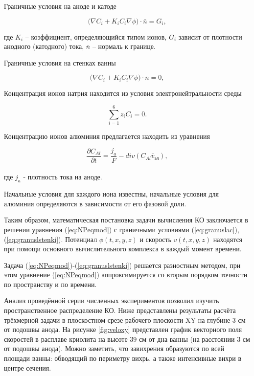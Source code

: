 \documentclass[pdflatex,sn-mathphys-gost]{pmi-jnl}
\begin{document}
Граничные условия на аноде и катоде

\begin{equation}\label{eq:granuslac}
	\big(\nabla C_i + K_i C_i \nabla \phi \big) \cdot \bar{n} = G_i,
\end{equation}

где $K_i$ – коэффициент, определяющийся типом ионов,  $G_i$ зависит от плотности анодного (катодного) тока, $\bar{n}$ – нормаль к границе.

Граничные условия на стенках ванны

\begin{equation}\label{eq:granuslstenki}
	\big(\nabla C_i + K_i C_i \nabla \phi \big) \cdot \bar{n} = 0,
\end{equation}

Концентрация ионов натрия находится из условия электронейтральности среды

\[ \sum\limits_{i=1}^6 z_iC_i = 0. \]

Концентрацию ионов алюминия предлагается находить из уравнения

\[ \frac{\partial C_{Al}}{\partial t} = \frac{j_a}{F} - div(C_{Al} \bar{v}_{\text{эл}}), \]
\\
где $j_a$ - плотность тока на аноде.

Начальные условия для каждого иона известны, начальные условия для алюминия определяются в зависимости от его фазовой доли.

Таким образом, математическая постановка задачи вычисления КО заключается в решении уравнения (\ref{eq:NPeqmod}) с граничными условиями (\ref{eq:granuslac}), (\ref{eq:granuslstenki}). Потенциал $\phi(t,x,y,z)$ и скорость $v(t,x,y,z)$ находятся при помощи основного вычислительного комплекса в каждый момент времени.

Задача (\ref{eq:NPeqmod})-(\ref{eq:granuslstenki}) решается разностным методом, при этом уравнение (\ref{eq:NPeqmod}) аппроксимируется со вторым порядком точности по пространству и по времени.

Анализ проведённой серии численных экспериментов позволил изучить пространственное распределение КО.
Ниже представлены результаты расчёта трёхмерной задачи в плоскостном срезе рабочего плоскости XY на глубине 3 см от подошвы анода. На рисунке \ref{fig:veloxy} представлен график векторного поля скоростей в расплаве криолита на высоте 39 см от дна ванны (на расстоянии 3 см от подошвы анода). Можно заметить, что завихрения образуются по всей площади ванны: обводящий по периметру вихрь, а также интенсивные вихри в центре сечения.
\end{document}
